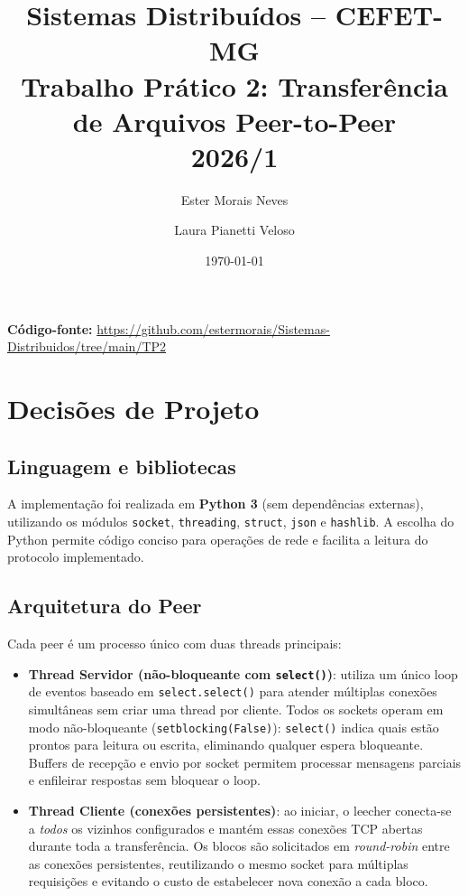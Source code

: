 \documentclass[12pt,a4paper]{article}
\title{
    \textbf{Sistemas Distribuídos -- CEFET-MG}\\
    \large Trabalho Prático 2: Transferência de Arquivos Peer-to-Peer\\
    2026/1
}
\author{Ester Morais Neves \and Laura Pianetti Veloso}
\date{\today}
\begin{document}
\maketitle
\thispagestyle{empty}

\textbf{Código-fonte:}
\url{https://github.com/estermorais/Sistemas-Distribuidos/tree/main/TP2}

\section{Decisões de Projeto}

\subsection{Linguagem e bibliotecas}

A implementação foi realizada em \textbf{Python 3} (sem dependências externas),
utilizando os módulos \texttt{socket}, \texttt{threading}, \texttt{struct},
\texttt{json} e \texttt{hashlib}. A escolha do Python permite código conciso
para operações de rede e facilita a leitura do protocolo implementado.

\subsection{Arquitetura do Peer}

Cada peer é um processo único com duas threads principais:

\begin{itemize}
    \item \textbf{Thread Servidor (não-bloqueante com \texttt{select()})}: utiliza
          um único loop de eventos baseado em \texttt{select.select()} para atender
          múltiplas conexões simultâneas sem criar uma thread por cliente.
          Todos os sockets operam em modo não-bloqueante
          (\texttt{setblocking(False)}): \texttt{select()} indica quais estão prontos
          para leitura ou escrita, eliminando qualquer espera bloqueante.
          Buffers de recepção e envio por socket permitem processar mensagens
          parciais e enfileirar respostas sem bloquear o loop.

    \item \textbf{Thread Cliente (conexões persistentes)}: ao iniciar, o leecher
          conecta-se a \emph{todos} os vizinhos configurados e mantém essas conexões
          TCP abertas durante toda a transferência. Os blocos são solicitados em
          \emph{round-robin} entre as conexões persistentes, reutilizando o mesmo
          socket para múltiplas requisições e evitando o custo de estabelecer nova
          conexão a cada bloco.
\end{itemize}
\end{document}
